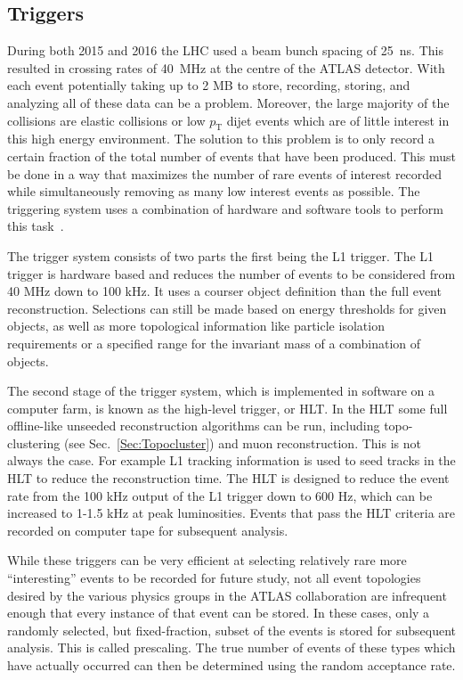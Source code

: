  

\subsection{Triggers}
\label{Trig}
During both 2015 and 2016 the LHC used a beam bunch spacing of 25~ns.  
This resulted in crossing rates of 40~MHz at the centre of the ATLAS detector.  
With each event potentially taking up to 2 MB to store, recording, storing, and analyzing all of these data can be a problem.  
Moreover, the large majority of the collisions are elastic collisions or low $p_{\mathrm T}$ dijet events which are of little interest in this high energy environment.  
The solution to this problem is to only record a certain fraction of the total number of events that have been produced.  
This must be done in a way that maximizes the number of rare events of interest recorded while simultaneously removing as many low interest events as possible.  
The triggering system uses a combination of hardware and software tools to perform this task~\cite{Run2Triggers}.  

The trigger system consists of two parts the first being the \gls{L1} trigger.  
The L1 trigger is hardware based and reduces the number of events to be considered from 40 MHz down to 100 kHz.  
It uses a courser object definition than the full event reconstruction.  
Selections can still be made based on energy thresholds for given objects, as well as more topological information like particle isolation requirements or a specified range for the invariant mass of a combination of objects.  

The second stage of the trigger system, which is implemented in software on a computer farm, is known as the high-level trigger, or HLT.  
In the HLT some full offline-like unseeded reconstruction algorithms can be run, including topo-clustering (see Sec.~\ref{Sec:Topocluster}) and muon reconstruction.  
This is not always the case.  
For example L1 tracking information is used to seed tracks in the HLT to reduce the reconstruction time.  
The HLT is designed to reduce the event rate from the 100 kHz output of the L1 trigger down to 600 Hz, which can be increased to 1-1.5 kHz at peak luminosities.  
Events that pass the HLT criteria are recorded on computer tape for subsequent analysis.   

While these triggers can be very efficient at selecting relatively rare more ``interesting'' events to be recorded for future study, not all event topologies desired by the various physics groups in the ATLAS collaboration are infrequent enough that every instance of that event can be stored.  
In these cases, only a randomly selected, but fixed-fraction, subset of the events is stored for subsequent analysis.  
This is called prescaling.  
The true number of events of these types which have actually occurred can then be determined using the random acceptance rate.  
 
 
 





